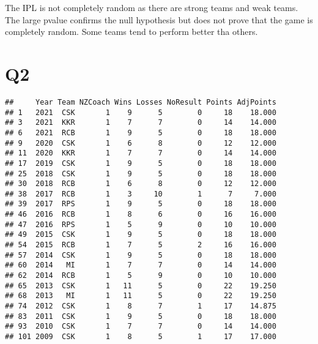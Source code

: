 \documentclass[
]{article}
\newenvironment{Shaded}{\begin{snugshade}}{\end{snugshade}}
\newcommand{\DecValTok}[1]{\textcolor[rgb]{0.00,0.00,0.81}{#1}}
\newcommand{\FunctionTok}[1]{\textcolor[rgb]{0.00,0.00,0.00}{#1}}
\newcommand{\NormalTok}[1]{#1}
\newcommand{\OtherTok}[1]{\textcolor[rgb]{0.56,0.35,0.01}{#1}}
\newcommand{\SpecialCharTok}[1]{\textcolor[rgb]{0.00,0.00,0.00}{#1}}
\begin{document}
The IPL is not completely random as there are strong teams and weak
teams. The large pvalue confirms the null hypothesis but does not prove
that the game is completely random. Some teams tend to perform better
tha others.

\hypertarget{q2}{%
\section{Q2}\label{q2}}

\begin{Shaded}
\end{Shaded}

\begin{verbatim}
##     Year Team NZCoach Wins Losses NoResult Points AdjPoints
## 1   2021  CSK       1    9      5        0     18    18.000
## 3   2021  KKR       1    7      7        0     14    14.000
## 6   2021  RCB       1    9      5        0     18    18.000
## 9   2020  CSK       1    6      8        0     12    12.000
## 11  2020  KKR       1    7      7        0     14    14.000
## 17  2019  CSK       1    9      5        0     18    18.000
## 25  2018  CSK       1    9      5        0     18    18.000
## 30  2018  RCB       1    6      8        0     12    12.000
## 38  2017  RCB       1    3     10        1      7     7.000
## 39  2017  RPS       1    9      5        0     18    18.000
## 46  2016  RCB       1    8      6        0     16    16.000
## 47  2016  RPS       1    5      9        0     10    10.000
## 49  2015  CSK       1    9      5        0     18    18.000
## 54  2015  RCB       1    7      5        2     16    16.000
## 57  2014  CSK       1    9      5        0     18    18.000
## 60  2014   MI       1    7      7        0     14    14.000
## 62  2014  RCB       1    5      9        0     10    10.000
## 65  2013  CSK       1   11      5        0     22    19.250
## 68  2013   MI       1   11      5        0     22    19.250
## 74  2012  CSK       1    8      7        1     17    14.875
## 83  2011  CSK       1    9      5        0     18    18.000
## 93  2010  CSK       1    7      7        0     14    14.000
## 101 2009  CSK       1    8      5        1     17    17.000
\end{verbatim}
\end{document}
